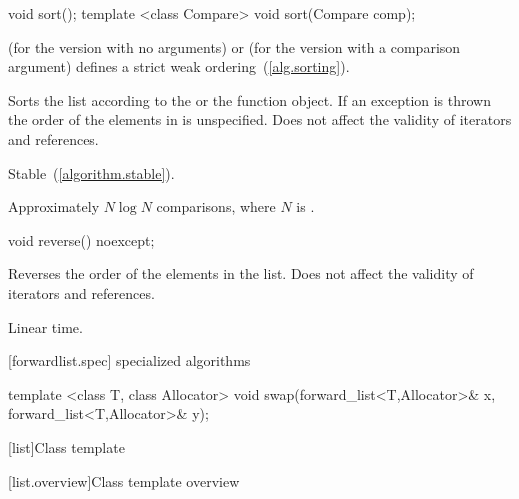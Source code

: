 %
%
\begin{itemdecl}
void sort();
template <class Compare> void sort(Compare comp);
\end{itemdecl}

\begin{itemdescr}
\pnum
\requires {} (for the version with no arguments) or  (for the
version with a comparison argument) defines a strict weak ordering~(\ref{alg.sorting}).

\pnum
\effects Sorts the list according to the  or the  function object.
If an exception is thrown the order of the elements in  is unspecified.
Does not affect the validity of iterators and references.

\pnum
\remarks Stable~(\ref{algorithm.stable}).

\pnum
\complexity Approximately $N \log N$ comparisons, where $N$ is .
\end{itemdescr}

%
%
\begin{itemdecl}
void reverse() noexcept;
\end{itemdecl}

\begin{itemdescr}
\pnum
\effects Reverses the order of the elements in the list.
Does not affect the validity of iterators and references.

\pnum
\complexity Linear time.
\end{itemdescr}

[forwardlist.spec]{ specialized algorithms}

%
%
\begin{itemdecl}
template <class T, class Allocator>
  void swap(forward_list<T,Allocator>& x, forward_list<T,Allocator>& y);
\end{itemdecl}

\begin{itemdescr}
\pnum
\effects {}
\end{itemdescr}

[list]{Class template }

[list.overview]{Class template  overview}

